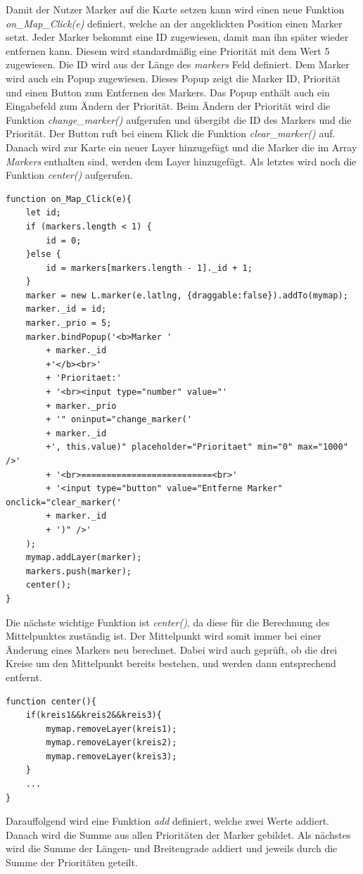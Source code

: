 \documentclass[a4paper, 12pt]{scrreprt}
\begin{document}
Damit der Nutzer Marker auf die Karte setzen kann wird einen neue Funktion \textit{on\_Map\_Click(e)} definiert, welche an der angeklickten Position einen Marker setzt.
Jeder Marker bekommt eine ID zugewiesen, damit man ihn später wieder entfernen kann.
Diesem wird standardmäßig eine Priorität mit dem Wert 5 zugewiesen.
Die ID wird aus der Länge des \textit{markers} Feld definiert.
Dem Marker wird auch ein Popup zugewiesen.
Dieses Popup zeigt die Marker ID, Priorität und einen Button zum Entfernen des Markers.
Das Popup enthält auch ein Eingabefeld zum Ändern der Priorität.
Beim Ändern der Priorität wird die Funktion \textit{change}\_\textit{marker()} aufgerufen und übergibt die ID des Markers und die Priorität.
Der Button ruft bei einem Klick die Funktion \textit{clear}\_\textit{marker()} auf.
Danach wird zur Karte ein neuer Layer hinzugefügt und die Marker die im Array \textit{Markers} enthalten sind, werden dem Layer hinzugefügt.
Als letztes wird noch die Funktion \textit{center()} aufgerufen.
\begin{lstlisting}
function on_Map_Click(e){
	let id;
	if (markers.length < 1) {
		id = 0;
	}else {
		id = markers[markers.length - 1]._id + 1;
	}
	marker = new L.marker(e.latlng, {draggable:false}).addTo(mymap);
	marker._id = id;
	marker._prio = 5;
	marker.bindPopup('<b>Marker '
		+ marker._id
		+'</b><br>'
    	+ 'Prioritaet:'
		+ '<br><input type="number" value="'
		+ marker._prio
		+ '" oninput="change_marker('
		+ marker._id
		+', this.value)" placeholder="Prioritaet" min="0" max="1000" />'
		+ '<br>==========================<br>'
		+ '<input type="button" value="Entferne Marker" onclick="clear_marker('
		+ marker._id
		+ ')" />'
	);
	mymap.addLayer(marker);
	markers.push(marker);
	center();
}
\end{lstlisting}
Die nächste wichtige Funktion ist \textit{center()}, da diese für die Berechnung des Mittelpunktes zuständig ist.
Der Mittelpunkt wird somit immer bei einer Änderung eines Markers neu berechnet.
Dabei wird auch geprüft, ob die drei Kreise um den Mittelpunkt bereits bestehen, und werden dann entsprechend entfernt.
\begin{lstlisting}
function center(){
	if(kreis1&&kreis2&&kreis3){
		mymap.removeLayer(kreis1);
		mymap.removeLayer(kreis2);
		mymap.removeLayer(kreis3);
	}
	...
}
\end{lstlisting}
Darauffolgend wird eine Funktion \textit{add} definiert, welche zwei Werte addiert. Danach wird die Summe aus allen Prioritäten der Marker gebildet. Als nächstes wird die Summe der Längen- und Breitengrade addiert und jeweils durch die Summe der Prioritäten geteilt.
\end{document}
